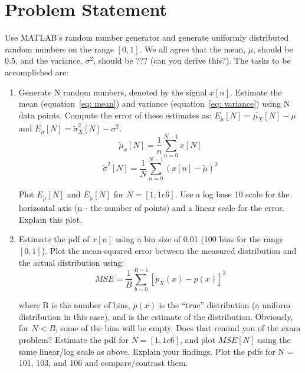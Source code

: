 \section{Problem Statement} 
Use MATLAB's random number generator and generate uniformly distributed random numbers on the range $[0,1]$. We all agree that the mean, $\mu$, should be $0.5$, and the variance, $\sigma^2$, should be ??? (can you derive this?).
The tasks to be accomplished are:
\begin{enumerate}
\item  Generate N random numbers, denoted by the signal $x[n]$. Estimate the mean (equation~\ref{eq: mean}) and variance (equation~\ref{eq: variance}) using N data points. Compute the error of these estimates as:
$E_{\tilde{\mu}}[N] = \tilde{\mu_X}[N] - \mu$ and $E_{\tilde{\sigma}}[N] = \tilde{\sigma}^2_X[N] - \sigma^2$. 
\begin{equation} 
\tilde{\mu}_x[N] = \frac{1}{n}\sum_{n=0}^{N-1} x[N]
\label{eq: mean}
\end{equation}
\begin{equation}
\tilde{\sigma}^2[N] = \frac{1}{N}\sum_{n=0}^{N-1}(x[n]-\tilde{\mu})^2
\label{eq: variance}
\end{equation}

Plot $E_{\tilde{\mu}}[N]$ and $E_{\tilde{\mu}}[N]$ for $N=[1, 1e6]$. Use a log base 10 scale for the horizontal axis (n - the number of points) and a linear scale for the error. Explain this plot.
\item  Estimate the pdf of $x[n]$ using a bin size of 0.01 (100 bins for the range $[0,1]$). Plot the mean-squared error between the measured distribution and the actual distribution using:
\begin{equation}
MSE = \frac{1}{B}\sum_{b=0}^{B-1}[\tilde{p}_X(x)-p(x)]^2
\label{eq: mse}
\end{equation}

where B is the number of bins, $p(x)$ is the ``true'' distribution (a uniform distribution in this case), and  is the estimate of the distribution. Obviously, for $N < B$, some of the bins will be empty. Does that remind you of the exam problem?
Estimate the pdf for $N = [1, 1e6]$, and plot $MSE[N]$ using the same linear/log scale as above. Explain your findings. Plot the pdfs for N = 101, 103, and 106 and compare/contrast them.
\end{enumerate}

